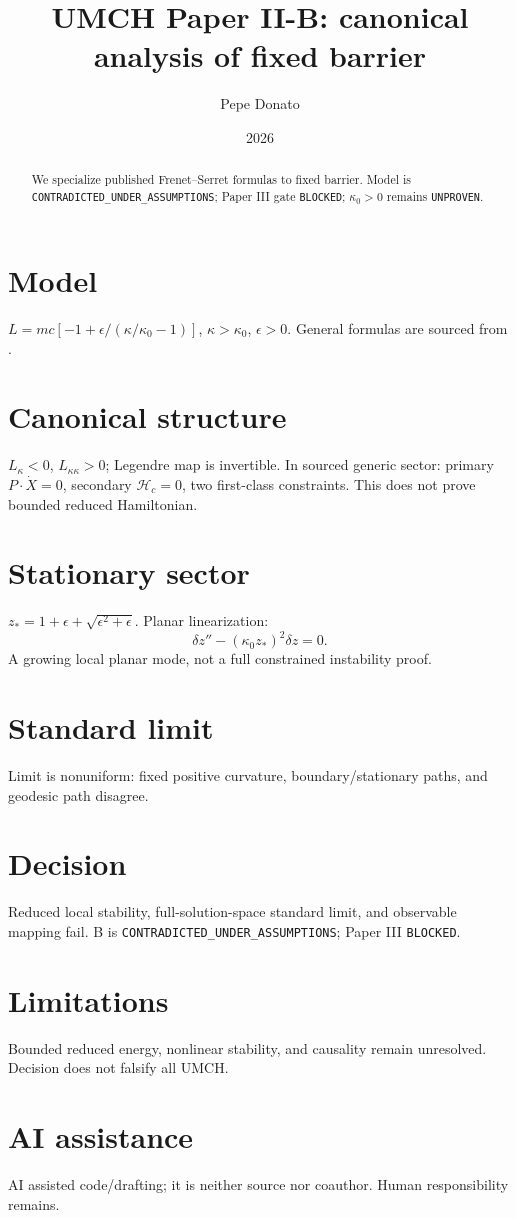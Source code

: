 \documentclass[11pt,a4paper]{article}
\title{UMCH Paper II-B: canonical analysis of fixed barrier}
\author{Pepe Donato}\date{2026}
\begin{document}
\maketitle
\begin{abstract}We specialize published Frenet--Serret formulas to fixed barrier. Model is \texttt{CONTRADICTED\_UNDER\_ASSUMPTIONS}; Paper III gate \texttt{BLOCKED}; $\kappa_0>0$ remains \texttt{UNPROVEN}.\end{abstract}
\section{Model}\label{sec:p2b-model}
$L=mc[-1+\epsilon/(\kappa/\kappa_0-1)]$, $\kappa>\kappa_0$, $\epsilon>0$. General formulas are sourced from \cite{ArreagaCapovillaGuven2001,CapovillaGuvenRojas2002}.
\section{Canonical structure}\label{sec:p2b-canonical}
$L_\kappa<0$, $L_{\kappa\kappa}>0$; Legendre map is invertible. In sourced generic sector: primary $P\cdot\dot X=0$, secondary $\mathcal H_c=0$, two first-class constraints. This does not prove bounded reduced Hamiltonian.
\section{Stationary sector}\label{sec:p2b-stationary}
$z_*=1+\epsilon+\sqrt{\epsilon^2+\epsilon}$. Planar linearization:
\[\delta z''-(\kappa_0z_*)^2\delta z=0.\]
A growing local planar mode, not a full constrained instability proof.
\section{Standard limit}\label{sec:p2b-limit}
Limit is nonuniform: fixed positive curvature, boundary/stationary paths, and geodesic path disagree.
\section{Decision}\label{sec:p2b-gate}
Reduced local stability, full-solution-space standard limit, and observable mapping fail. B is \texttt{CONTRADICTED\_UNDER\_ASSUMPTIONS}; Paper III \texttt{BLOCKED}.
\section{Limitations}\label{sec:p2b-limits}
Bounded reduced energy, nonlinear stability, and causality remain unresolved. Decision does not falsify all UMCH.
\section{AI assistance}\label{sec:p2b-ai}
AI assisted code/drafting; it is neither source nor coauthor. Human responsibility remains.

\end{document}
